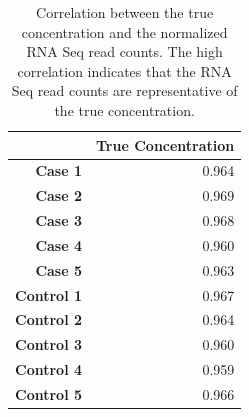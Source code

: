 \begin{table}[h]
	\centering
	\caption{Correlation between the true concentration and the normalized RNA Seq read counts.
		The high correlation indicates that the RNA Seq read counts are representative of the true concentration.}
	\label{tab:ercc_correlation}
	\begin{tabular}{rr}
		\toprule
		& \textbf{True Concentration} \\
		\midrule
		\textbf{Case 1} & 0.964 \\
		\textbf{Case 2} & 0.969 \\
		\textbf{Case 3} & 0.968 \\
		\textbf{Case 4} & 0.960 \\
		\textbf{Case 5} & 0.963 \\
		\textbf{Control 1} & 0.967 \\
		\textbf{Control 2} & 0.964 \\
		\textbf{Control 3} & 0.960 \\
		\textbf{Control 4} & 0.959 \\
		\textbf{Control 5} & 0.966 \\
		\bottomrule
	\end{tabular}%
\end{table}
\\
\\



